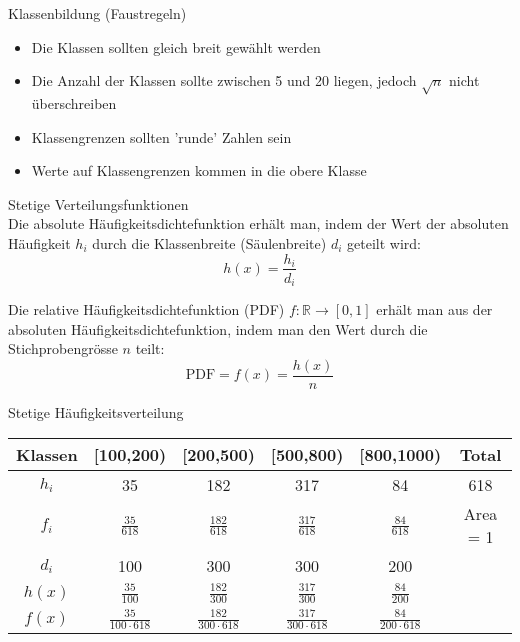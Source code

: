 \begin{concept}{Klassenbildung (Faustregeln)}\\
\begin{itemize}
  \item Die Klassen sollten gleich breit gewählt werden
  \item Die Anzahl der Klassen sollte zwischen 5 und 20 liegen, jedoch $\sqrt{n}$ nicht überschreiben
  \item Klassengrenzen sollten 'runde' Zahlen sein
  \item Werte auf Klassengrenzen kommen in die obere Klasse
\end{itemize}
\end{concept}

\begin{definition}{Stetige Verteilungsfunktionen}\\
Die absolute Häufigkeitsdichtefunktion erhält man, indem der Wert der absoluten Häufigkeit $h_i$ durch die Klassenbreite (Säulenbreite) $d_i$ geteilt wird:
$$h(x) = \frac{h_i}{d_i}$$

Die relative Häufigkeitsdichtefunktion (PDF) $f: \mathbb{R} \rightarrow [0,1]$ erhält man aus der absoluten Häufigkeitsdichtefunktion, indem man den Wert durch die Stichprobengrösse $n$ teilt:
$$\text{PDF} = f(x) = \frac{h(x)}{n}$$
\end{definition}

\begin{example2}{Stetige Häufigkeitsverteilung}
\renewcommand{\arraystretch}{2}%
\begin{center}
\begin{tabular}{|c|c|c|c|c|c|}
\hline
Klassen & [100,200) & [200,500) & [500,800) & [800,1000) & Total \\
\hline
$h_i$ & 35 & 182 & 317 & 84 & 618 \\
\hline
$f_i$ & $\frac{35}{618}$ & $\frac{182}{618}$ & $\frac{317}{618}$ & $\frac{84}{618}$ & Area = 1 \\
\hline
$d_i$ & 100 & 300 & 300 & 200 & \\
\hline
$h(x)$ & $\frac{35}{100}$ & $\frac{182}{300}$ & $\frac{317}{300}$ & $\frac{84}{200}$ & \\
\hline
$f(x)$ & $\frac{35}{100 \cdot 618}$ & $\frac{182}{300 \cdot 618}$ & $\frac{317}{300 \cdot 618}$ & $\frac{84}{200 \cdot 618}$ & \\
\hline
\end{tabular}
\end{center}
\end{example2}

